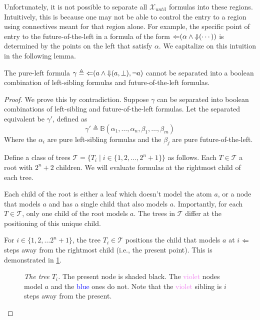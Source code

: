 \documentclass[a4paper,UKenglish,cleveref, autoref, thm-restate, numberwithinsect]{lipics-v2021}
\def\Larrow{\ensuremath\mathord{\Leftarrow}}
\def\Darrow{\ensuremath\mathord{\Downarrow}}
\begin{document}
Unfortunately, it is not possible to separate all $\mathcal{X}_{until}$ formulas into these regions. Intuitively, this is because one may not be able to control the entry to a region using connectives meant for that region alone. For example, the specific point of entry to the future-of-the-left in a formula of the form $\Larrow(\alpha \land \Darrow(\cdots))$ is determined by the points on the left that satisfy $\alpha$. We capitalize on this intuition in the following lemma.
\begin{lemma}
    The pure-left formula $\gamma \triangleq \Larrow(a \land \Darrow(a, \bot), \lnot a)$ cannot be separated into a boolean combination of left-sibling formulas and future-of-the-left formulas.
\end{lemma}
\begin{proof}
    We prove this by contradiction. Suppose $\gamma$ can be separated into boolean combinations of left-sibling and future-of-the-left formulas. Let the separated equivalent be $\gamma'$, defined as
    \begin{equation*}
        \gamma' \triangleq \mathbb{B}(\alpha_1, \ldots, \alpha_n, \beta_1, \ldots, \beta_m)
    \end{equation*}
    Where the $\alpha_i$ are pure left-sibling formulas and the $\beta_j$ are pure future-of-the-left.

    Define a class of trees $\mathcal{T} = \{ T_i \mid i \in \{1, 2, \ldots, 2^n + 1\}\}$ as follows. Each $T \in \mathcal{T}$ a root with $2^{n} + 2$ children. We will evaluate formulas at the rightmost child of each tree.

    Each child of the root is either a leaf which doesn't model the atom $a$, or a node that models $a$ and has a single child that also models $a$. Importantly, for each $T \in \mathcal{T}$, only one child of the root models $a$. The trees in $\mathcal{T}$ differ at the positioning of this unique child.

    For $i \in \{1, 2, \ldots 2^n + 1\}$, the tree $T_i \in \mathcal{T}$ positions the child that models $a$ at $i$ $\Larrow$ steps away from the rightmost child (i.e., the present point). This is demonstrated in \cref{fineRegionsTree}.
    \begin{figure}[h]
        \centering
        \caption{\emph{The tree $T_i$.} The present node is shaded black. The \textcolor{violet}{violet} nodes model $a$ and the \textcolor{blue}{blue} ones do not. Note that the \textcolor{violet}{violet} sibling is $i$ steps away from the present.}
        \label{fineRegionsTree}
    \end{figure}


\end{proof}
\end{document}
